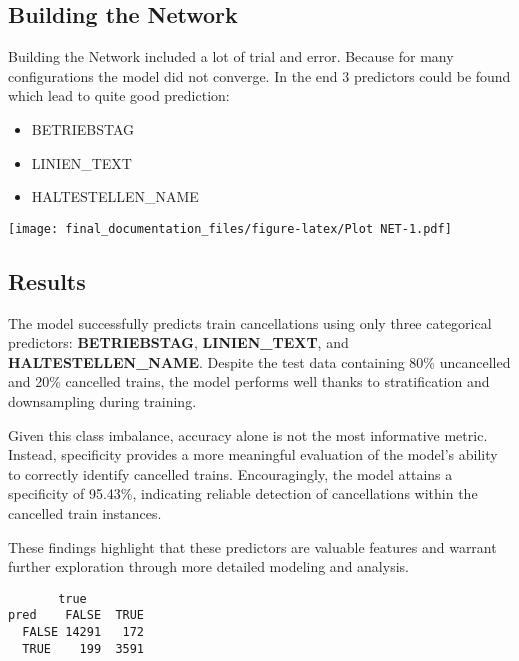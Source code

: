\documentclass[
]{article}
\providecommand{\tightlist}{%
  \setlength{\itemsep}{0pt}\setlength{\parskip}{0pt}}
\begin{document}
\subsection{Building the Network}\label{building-the-network}

Building the Network included a lot of trial and error. Because for many
configurations the model did not converge. In the end 3 predictors could
be found which lead to quite good prediction:

\begin{itemize}
\tightlist
\item
  BETRIEBSTAG
\item
  LINIEN\_TEXT
\item
  HALTESTELLEN\_NAME
\end{itemize}

\texttt{[image: final\_documentation\_files/figure-latex/Plot NET-1.pdf]}

\subsection{Results}\label{results}

The model successfully predicts train cancellations using only three
categorical predictors: \textbf{BETRIEBSTAG}, \textbf{LINIEN\_TEXT}, and
\textbf{HALTESTELLEN\_NAME}. Despite the test data containing 80\%
uncancelled and 20\% cancelled trains, the model performs well thanks to
stratification and downsampling during training.

Given this class imbalance, accuracy alone is not the most informative
metric. Instead, specificity provides a more meaningful evaluation of
the model's ability to correctly identify cancelled trains.
Encouragingly, the model attains a specificity of 95.43\%, indicating
reliable detection of cancellations within the cancelled train
instances.

These findings highlight that these predictors are valuable features and
warrant further exploration through more detailed modeling and analysis.

\begin{verbatim}
       true
pred    FALSE  TRUE
  FALSE 14291   172
  TRUE    199  3591
\end{verbatim}
\end{document}
